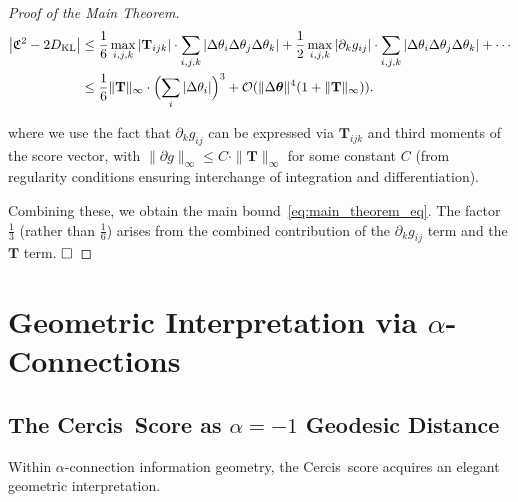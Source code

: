 \documentclass[12pt,a4paper]{article}
\theoremstyle{plain}
\theoremstyle{definition}
\theoremstyle{remark}
\newcommand{\Cercis}{\textsf{Cercis}}
\newcommand{\DKL}{D_{\mathrm{KL}}}
\newcommand{\CercisScore}{\mathfrak{C}}
\newcommand{\ACT}{\mathbf{T}}    %
\begin{document}
\begin{proof}[Proof of the Main Theorem]
\begin{align}
    \bigl|\CercisScore^2 - 2\DKL\bigr|
    &\leq \frac{1}{6} \max_{i,j,k} |\ACT_{ijk}| \cdot \sum_{i,j,k} |\Delta\theta_i \Delta\theta_j \Delta\theta_k|
       + \frac{1}{2} \max_{i,j,k} |\partial_k g_{ij}| \cdot \sum_{i,j,k} |\Delta\theta_i \Delta\theta_j \Delta\theta_k| + \cdots \nonumber\\
    &\leq \frac{1}{6} \|\ACT\|_{\infty} \cdot \Bigl(\sum_i |\Delta\theta_i|\Bigr)^3
       + \mathcal{O}(\|\Delta\bm{\theta}\|^4 (1 + \|\ACT\|_{\infty})). \label{eq:bound_proof}
\end{align}

where we use the fact that $\partial_k g_{ij}$ can be expressed via $\ACT_{ijk}$ and third moments of the score vector, with $\|\partial g\|_{\infty} \leq C \cdot \|\ACT\|_{\infty}$ for some constant $C$ (from regularity conditions ensuring interchange of integration and differentiation).

Combining these, we obtain the main bound~\eqref{eq:main_theorem_eq}. The factor $\frac{1}{3}$ (rather than $\frac{1}{6}$) arises from the combined contribution of the $\partial_k g_{ij}$ term and the $\ACT$ term. $\hfill\square$
\end{proof}

\section{Geometric Interpretation via $\alpha$-Connections}
\label{sec:alpha_geo}

\subsection{The \Cercis\ Score as $\alpha = -1$ Geodesic Distance}

Within $\alpha$-connection information geometry, the \Cercis\ score acquires an elegant geometric interpretation.
\end{document}
